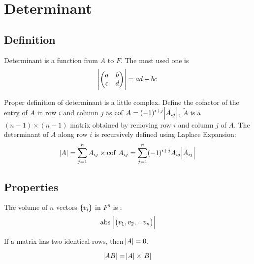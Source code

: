 \chapter{Determinant}


\section{Definition}

Determinant is a function from $A$ to $F$. The most used one is 
\begin{equation}
    \abs{\begin{pmatrix}
        a & b \\
        c & d
    \end{pmatrix}} = ad - bc
\end{equation}


Proper definition of determinant is a little complex. Define the cofactor of the entry of $A$ in row $i$ and column $j$ as $\displaystyle \mathrm{cof}~\displaystyle A = (-1)^{i+j} \abs{\tilde{A}_{ij}}$, $\tilde{A}$ is a $(n-1)\times (n-1)$ matrix obtained by removing row $i$ and column $j$ of $A$. The determinant of $A$ along row $i$ is recursively defined using Laplace Expansion:
\begin{equation}
    \abs{A} = \sum_{j=1}^n A_{ij} \times \displaystyle \mathrm{cof}~\displaystyle A_{ij} = \sum_{j=1}^n (-1)^{i+j} A_{ij}  \abs{\tilde{A}_{ij}}
\end{equation}


\section{Properties}

\begin{theorem}
    The volume of $n$ vectors $\set{v_i}$ in $F^n$ is :
    \begin{equation}
      \mathrm{abs}~\abs{\begin{pmatrix}
            v_1, v_2, ... v_n
        \end{pmatrix}}
    \end{equation}
\end{theorem}


\begin{theorem}
    If a matrix has two identical rows, then $\abs{A} = 0$.
\end{theorem}


\begin{theorem}
    \begin{equation}
        \abs{AB} = \abs{A} \times \abs{B}
    \end{equation}    
\end{theorem}


